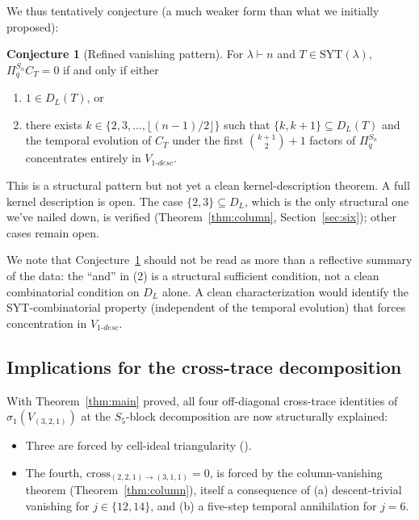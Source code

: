 \documentclass[11pt]{article}
\theoremstyle{definition}
\newtheorem{conjecture}[theorem]{Conjecture}
\begin{document}
We thus tentatively conjecture (a much weaker form than what we initially proposed):

\begin{conjecture}[Refined vanishing pattern]\label{conj:refined}
For $\lambda \vdash n$ and $T \in \mathrm{SYT}(\lambda)$, $\Pi_q^{S_n} C_T = 0$ if and only if either
\begin{enumerate}[leftmargin=2em,label=(\arabic*)]
\item $1 \in D_L(T)$, or
\item there exists $k \in \{2, 3, \ldots, \lfloor (n-1)/2 \rfloor\}$ such that $\{k, k+1\} \subseteq D_L(T)$ and the temporal evolution of $C_T$ under the first $\binom{k+1}{2}+1$ factors of $\Pi_q^{S_n}$ concentrates entirely in $V_{1\text{-}desc}$.
\end{enumerate}
\end{conjecture}

This is a structural pattern but not yet a clean kernel-description theorem. A full kernel description is open. The case $\{2, 3\} \subseteq D_L$, which is the only structural one we've nailed down, is verified (Theorem~\ref{thm:column}, Section~\ref{sec:six}); other cases remain open.

We note that Conjecture~\ref{conj:refined} should not be read as more than a reflective summary of the data: the ``and'' in (2) is a structural sufficient condition, not a clean combinatorial condition on $D_L$ alone. A clean characterization would identify the SYT-combinatorial property (independent of the temporal evolution) that forces concentration in $V_{1\text{-}desc}$.

\subsection*{Implications for the cross-trace decomposition}

With Theorem~\ref{thm:main} proved, all four off-diagonal cross-trace identities of $\sigma_1(V_{(3,2,1)})$ at the $S_5$-block decomposition are now structurally explained:
\begin{itemize}[leftmargin=2em,topsep=0.3em,itemsep=0.2em]
\item Three are forced by cell-ideal triangularity (\cite[Corollary~3.2]{cell-ideal}).
\item The fourth, $\mathrm{cross}_{(2,2,1)\to(3,1,1)} = 0$, is forced by the column-vanishing theorem (Theorem~\ref{thm:column}), itself a consequence of (a) descent-trivial vanishing for $j \in \{12, 14\}$, and (b) a five-step temporal annihilation for $j = 6$.
\end{itemize}
\end{document}
